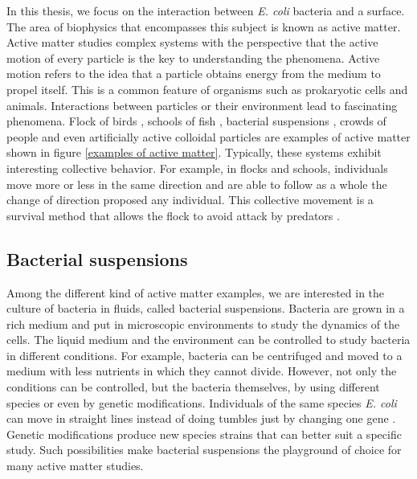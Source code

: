 In this thesis, we focus on the interaction between \textit{E. coli} bacteria and a surface. The area of biophysics that encompasses this subject is known as active matter. Active matter studies complex systems with the perspective that the active motion of every particle is the key to understanding the phenomena. Active motion refers to the idea that a particle obtains energy from the medium to propel itself. This is a common feature of organisms such as prokaryotic cells and animals. Interactions between particles or their environment lead to fascinating phenomena. Flock of birds \cite{Bialek2012StatisticalBirds,Cavagna2015FlockingMotion}, schools of fish \cite{Toner1998FlocksFlocking}, bacterial suspensions \cite{Lopez2015TurningSuperfluids, Clement2016BacterialFlow,Vincenti2019MagnetotacticMotor}, crowds of people \cite{Faria2010LeadershipCrowds} and even artificially active colloidal particles \cite{Zhang2018Light-controlledParticles, Jiang2020PickeringApplications} are examples of active matter shown in figure \ref{examples of active matter}. Typically, these systems exhibit interesting collective behavior. For example, in flocks and schools, individuals move more or less in the same direction and are able to follow as a whole the change of direction proposed any individual. This collective movement is a survival method that allows the flock to avoid attack by predators \cite{Bialek2012StatisticalBirds,Cavagna2015FlockingMotion}.



\subsection{Bacterial suspensions}

Among the different kind of active matter examples, we are interested in the culture of bacteria in fluids, called bacterial suspensions. Bacteria are grown in a rich medium and put in microscopic environments to study the dynamics of the cells. The liquid medium and the environment can be controlled to study bacteria in different conditions. For example, bacteria can be centrifuged and moved to a medium with less nutrients in which they cannot divide. However, not only the conditions can be controlled, but the bacteria themselves, by using different species or even by genetic modifications. Individuals of the same species \textit{E. coli} can move in straight lines instead of doing tumbles just by changing one gene \cite{VanVliet2014ThePopulations}. Genetic modifications produce new species strains that can better suit a specific study. Such possibilities make bacterial suspensions the playground of choice for many active matter studies.

